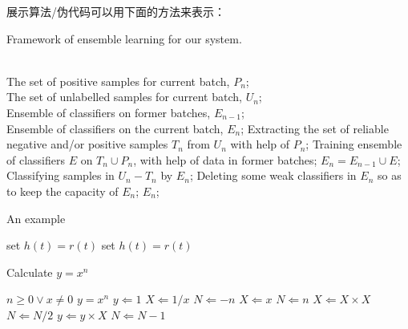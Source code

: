 \documentclass[12pt]{article}
\begin{document}
\clearpage
\songti{}展示算法/伪代码可以用下面的方法来表示：
\begin{algorithm}[htb]
    \caption{ Framework of ensemble learning for our system.}
    \label{alg:Framwork}
    \begin{algorithmic}[1] %
    \REQUIRE ~~\\ %
        The set of positive samples for current batch, $P_n$;\\
        The set of unlabelled samples for current batch, $U_n$;\\
        Ensemble of classifiers on former batches, $E_{n-1}$;
    \ENSURE ~~\\ %
        Ensemble of classifiers on the current batch, $E_n$;
        \STATE Extracting the set of reliable negative and/or positive samples $T_n$ from $U_n$ with help of $P_n$;
        \STATE Training ensemble of classifiers $E$ on $T_n \cup P_n$, with help of data in former batches;
        \STATE $E_n=E_{n-1}\cup E$;
        \STATE Classifying samples in $U_n-T_n$ by $E_n$;
        \STATE Deleting some weak classifiers in $E_n$ so as to keep the capacity of $E_n$;
    \RETURN $E_n$; %
    \end{algorithmic}
\end{algorithm}
\begin{algorithm}
    \caption{An example}
    \label{alg:2}
    \begin{algorithmic}
        \REPEAT
        \STATE set $h(t)=r(t)$
        \REPEAT
        \STATE set $h(t)=r(t)$
    \end{algorithmic}
\end{algorithm}
\begin{algorithm}
    \caption{Calculate $y = x^n$}
    \label{alg:3}
    \begin{algorithmic}
        \REQUIRE $n \geq 0 \vee x \neq 0$
        \ENSURE $y = x^n$
        \STATE $y \Leftarrow 1$
        \STATE $X \Leftarrow 1 / x$
        \STATE $N \Leftarrow -n$
    \ELSE
        \STATE $X \Leftarrow x$
        \STATE $N \Leftarrow n$
    \ENDIF
            \STATE $X \Leftarrow X \times X$
            \STATE $N \Leftarrow N / 2$
        \ELSE[$N$ is odd]
            \STATE $y \Leftarrow y \times X$
            \STATE $N \Leftarrow N - 1$
        \ENDIF
    \ENDWHILE
    \end{algorithmic}
\end{algorithm}
\end{document}
